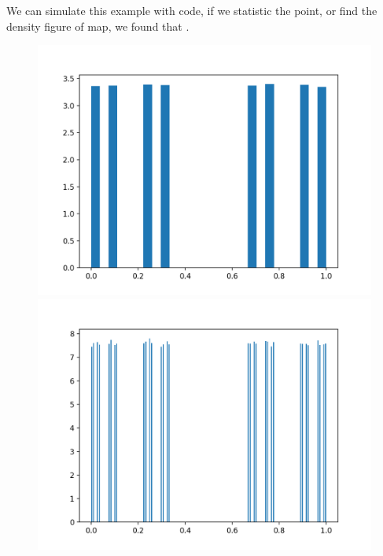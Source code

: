 \documentclass[12pt]{article}
\theoremstyle{plain}
\begin{document}
We can simulate this example with code, if we statistic the point, or find the density figure of map, we found that 
.\\[4ex]
\begin{figure}[H]
\begin{minipage}[c][0.33\width]{
   0.33\textwidth}
   \centering
   \includegraphics[width=.9\textwidth]{figure/section4/simple-stats-3.png}
\end{minipage}
\begin{minipage}[c][0.33\width]{
   0.33\textwidth}
   \centering
   \includegraphics[width=.9\textwidth]{figure/section4/simple-stats-5.png}
\end{minipage}
\begin{minipage}[c][0.33\width]{
   0.33\textwidth}
   \centering

\end{minipage}
\end{figure}
\end{document}

